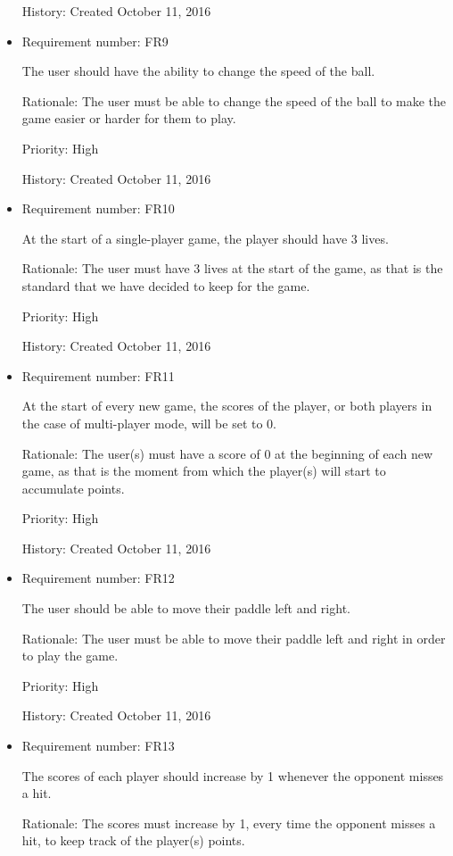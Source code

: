 \documentclass[12pt,letterpaper]{article}
\begin{document}
\begin{itemize}
		History: Created October 11, 2016

		\item Requirement number: FR9

		The user should have the ability to change the speed of the ball.

		Rationale: The user must be able to change the speed of the ball to make the game easier or harder for them to play.

		Priority: High

		History: Created October 11, 2016

		\item Requirement number: FR10

		At the start of a single-player game, the player should have 3 lives.

		Rationale: The user must have 3 lives at the start of the game, as that is the standard that we have decided to keep for the game.

		Priority: High

		History: Created October 11, 2016

		\item Requirement number: FR11

		At the start of every new game, the scores of the player, or both players in the case of multi-player mode, will be set to 0.

		Rationale: The user(s) must have a score of 0 at the beginning of each new game, as that is the moment from which the player(s) will start to accumulate points.

		Priority: High

		History: Created October 11, 2016

		\item Requirement number: FR12

		The user should be able to move their paddle left and right.

		Rationale: The user must be able to move their paddle left and right in order to play the game.

		Priority: High

		History: Created October 11, 2016

		\item Requirement number: FR13

		The scores of each player should increase by 1 whenever the opponent misses a hit.

		Rationale: The scores must increase by 1, every time the opponent misses a hit, to keep track of the player(s) points.


\end{itemize}
\end{document}
